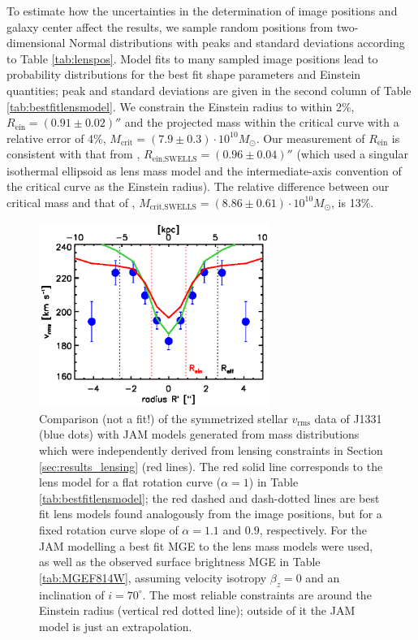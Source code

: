 \documentclass[useAMS,usenatbib]{mnras}
\begin{document}
To estimate how the uncertainties in the determination of image positions and galaxy center affect the results, we sample random positions from two-dimensional Normal distributions with peaks and standard deviations according to Table \ref{tab:lenspos}. Model fits to many sampled image positions lead to probability distributions for the best fit shape parameters and Einstein quantities; peak and standard deviations are given in the second column of Table \ref{tab:bestfitlensmodel}. We constrain the Einstein radius to within 2\%, $R_\text{ein} = (0.91 \pm 0.02)''$ and the projected mass within the critical curve with a relative error of 4\%, $M_\text{crit} =(7.9\pm0.3)\cdot 10^{10} M_\odot$. Our measurement of $R_\text{ein}$ is consistent with that from \citet{SWELLSIII}, $R_\text{ein,SWELLS} = (0.96 \pm 0.04)''$ (which used a singular isothermal ellipsoid as lens mass model and the intermediate-axis convention of the critical curve as the Einstein radius). The relative difference between our critical mass and that of \citet{SWELLSIII}, $M_\text{crit,SWELLS} =(8.86\pm0.61)\cdot 10^{10} M_\odot$, is 13\%.

\begin{figure}
  \centering
  \includegraphics[height=6cm]{fig/lensing_JAM_comparision.ps}
  \caption{Comparison (not a fit!) of the symmetrized stellar $v_\text{rms}$ data of J1331 (blue dots) with JAM models generated from mass distributions which were independently derived from lensing constraints in Section \ref{sec:results_lensing} (red lines). The red solid line corresponds to the lens model for a flat rotation curve ($\alpha = 1$) in Table \ref{tab:bestfitlensmodel}; the red dashed and dash-dotted lines are best fit lens models found analogously from the image positions, but for a fixed rotation curve slope of $\alpha = 1.1$ and $0.9$, respectively. For the JAM modelling a best fit MGE to the lens mass models were used, as well as the observed surface brightness MGE in Table \ref{tab:MGEF814W}, assuming velocity isotropy $\beta_z = 0$ and an inclination of $i = 70^\circ$. The most reliable constraints are around the Einstein radius (vertical red dotted line); outside of it the JAM model is just an extrapolation.}
  \label{fig:JAM_modelL}
\end{figure}
\end{document}
